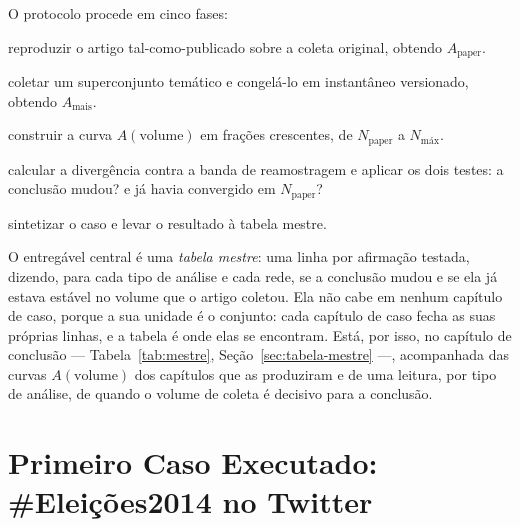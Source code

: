 O protocolo procede em cinco fases:

\begin{samepage}
\begin{description}[leftmargin=3.2em,style=nextline,itemsep=2pt]
  \item[Fase 0] reproduzir o artigo tal-como-publicado sobre a coleta original,
  obtendo $A_{\text{paper}}$.
  \item[Fase 1] coletar um superconjunto temático e congelá-lo em instantâneo
  versionado, obtendo $A_{\text{mais}}$.
  \item[Fase 2] construir a curva $A(\text{volume})$ em frações crescentes, de
  $N_{\text{paper}}$ a $N_{\text{máx}}$.
  \item[Fase 3] calcular a divergência contra a banda de reamostragem e aplicar os
  dois testes: a conclusão mudou? e já havia convergido em $N_{\text{paper}}$?
  \item[Fase 4] sintetizar o caso e levar o resultado à tabela mestre.
\end{description}
\end{samepage}

O entregável central é uma \emph{tabela mestre}: uma linha por afirmação testada,
dizendo, para cada tipo de análise e cada rede, se a conclusão mudou e se ela já
estava estável no volume que o artigo coletou. Ela não cabe em nenhum capítulo de
caso, porque a sua unidade é o conjunto: cada capítulo de caso fecha as suas
próprias linhas, e a tabela é onde elas se encontram. Está, por isso, no capítulo de
conclusão --- Tabela~\ref{tab:mestre}, Seção~\ref{sec:tabela-mestre} ---, acompanhada
das curvas $A(\text{volume})$ dos capítulos que as produziram e de uma leitura, por
tipo de análise, de quando o volume de coleta é decisivo para a conclusão.

\chapter{Primeiro Caso Executado: \#Eleições2014 no Twitter}
\label{cap:caso-twitter}

